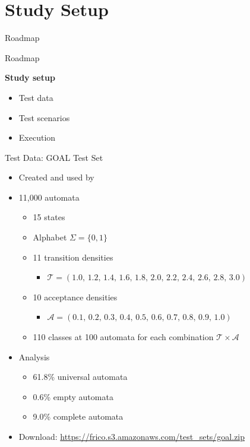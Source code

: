\documentclass[12pt]{beamer}
\newcommand{\tocstyle}[1]{
\Large
\vspace{0.25cm}
\hspace{0.5cm}
\parbox[top][0.66\textheight][c]{0.66\textwidth}{#1}}
\begin{document}
\section{Study Setup}
\begin{frame}{Roadmap}
\tocstyle{\tableofcontents[currentsection]}
\end{frame}

\begin{frame}{Roadmap}
\tocstyle{
\bfseries
Study setup
\large
\begin{itemize}\itemsep5pt \vspace{5pt}
\item Test data
\item Test scenarios
\item Execution
\end{itemize}}
\end{frame}

\begin{frame}{Test Data: GOAL Test Set}
\begin{itemize}
\item Created and used by~\cite{2011_tsai}
\item 11,000 automata
  \begin{itemize}
  \item 15 states
  \item Alphabet $\Sigma = \{0, 1\}$
  \pause
  \item 11 transition densities
    \begin{itemize}
    \item $\mathcal T=(1.0,\,1.2,\,1.4,\,1.6,\,1.8,\,2.0,\,2.2,\,2.4,\,2.6,\,2.8,\,3.0)$
    \end{itemize}
  \item 10 acceptance densities
    \begin{itemize}
    \item $\mathcal A=(0.1,\,0.2,\,0.3,\,0.4,\,0.5,\,0.6,\,0.7,\,0.8,\,0.9,\,1.0)$
    \end{itemize}
  \item 110 classes at 100 automata for each combination $\mathcal T \times \mathcal A$
  \end{itemize}
\pause
\item Analysis
  \begin{itemize}
  \item 61.8\% universal automata
  \item 0.6\% empty automata
  \item 9.0\% complete automata
  \end{itemize}
\pause
\item Download: \url{https://frico.s3.amazonaws.com/test_sets/goal.zip}
\end{itemize}
\end{frame}
\end{document}

